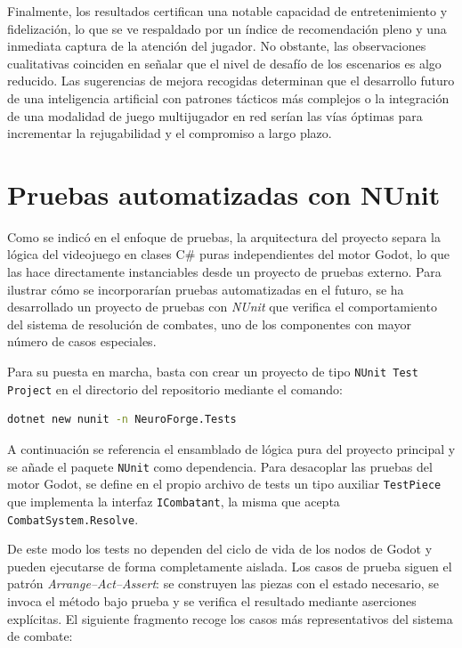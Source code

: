 Finalmente, los resultados certifican una notable capacidad de entretenimiento y fidelización, lo que se ve respaldado por un índice de recomendación pleno y una inmediata captura de la atención del jugador. No obstante, las observaciones cualitativas coinciden en señalar que el nivel de desafío de los escenarios es algo reducido. Las sugerencias de mejora recogidas determinan que el desarrollo futuro de una inteligencia artificial con patrones tácticos más complejos o la integración de una modalidad de juego multijugador en red serían las vías óptimas para incrementar la rejugabilidad y el compromiso a largo plazo.

\clearpage

\section{Pruebas automatizadas con NUnit}

Como se indicó en el enfoque de pruebas, la arquitectura del proyecto separa la lógica del videojuego en clases C\# puras independientes del motor Godot, lo que las hace directamente instanciables desde un proyecto de pruebas externo. Para ilustrar cómo se incorporarían pruebas automatizadas en el futuro, se ha desarrollado un proyecto de pruebas con \textit{NUnit} que verifica el comportamiento del sistema de resolución de combates, uno de los componentes con mayor número de casos especiales.

Para su puesta en marcha, basta con crear un proyecto de tipo \texttt{NUnit Test Project} en el directorio del repositorio mediante el comando:

\begin{lstlisting}[language=bash]
	dotnet new nunit -n NeuroForge.Tests
\end{lstlisting}

A continuación se referencia el ensamblado de lógica pura del proyecto principal y
se añade el paquete \texttt{NUnit} como dependencia. Para desacoplar las pruebas del
motor Godot, se define en el propio archivo de tests un tipo auxiliar \texttt{TestPiece}
que implementa la interfaz \texttt{ICombatant}, la misma que acepta \texttt{CombatSystem.Resolve}.

De este modo los tests no dependen del ciclo de vida de los nodos de Godot y pueden
ejecutarse de forma completamente aislada. Los casos de prueba siguen el patrón
\textit{Arrange--Act--Assert}: se construyen las piezas con el estado necesario,
se invoca el método bajo prueba y se verifica el resultado mediante aserciones
explícitas. El siguiente fragmento recoge los casos más representativos del sistema
de combate:

